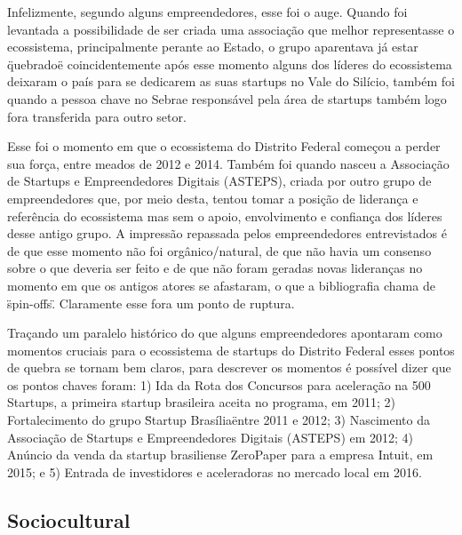 Infelizmente, segundo alguns empreendedores, esse foi o auge. Quando foi levantada a possibilidade de ser criada uma associação que melhor representasse o ecossistema, principalmente perante ao Estado, o grupo aparentava já estar \"quebrado\" e coincidentemente após esse momento alguns dos líderes do ecossistema deixaram o país para se dedicarem as suas startups no Vale do Silício, também foi quando a pessoa chave no Sebrae responsável pela área de startups também logo fora transferida para outro setor. 

Esse foi o momento em que o ecossistema do Distrito Federal começou a perder sua força, entre meados de 2012 e 2014. Também foi quando nasceu a Associação de Startups e Empreendedores Digitais (ASTEPS), criada por outro grupo de empreendedores que, por meio desta, tentou tomar a posição de liderança e referência do ecossistema mas sem o apoio, envolvimento e confiança dos líderes desse antigo grupo. A impressão repassada pelos empreendedores entrevistados é de que esse momento não foi orgânico/natural, de que não havia um consenso sobre o que deveria ser feito e de que não foram geradas novas lideranças no momento em que os antigos atores se afastaram, o que a bibliografia chama de \"spin-offs\". Claramente esse fora um ponto de ruptura.

Traçando um paralelo histórico do que alguns empreendedores apontaram como momentos cruciais para o ecossistema de startups do Distrito Federal esses pontos de quebra se tornam bem claros, para descrever os momentos é possível dizer que os pontos chaves foram: 1) Ida da Rota dos Concursos para aceleração na 500 Startups, a primeira startup brasileira aceita no programa, em 2011; 2) Fortalecimento do grupo \"Startup Brasília\" entre 2011 e 2012; 3) Nascimento da Associação de Startups e Empreendedores Digitais (ASTEPS) em 2012; 4) Anúncio da venda da startup brasiliense ZeroPaper para a empresa Intuit, em 2015; e 5) Entrada de investidores e aceleradoras no mercado local em 2016. 

\subsection{Sociocultural}
\label{subsection:pergunta_de_pesquisa_2}




